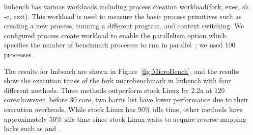 lmbench has various workloads including process creation workload(fork,
exec, sh -c, exit).
This workload is used to measure the basic process primitives such as creating
a new process, running a different program, and context switching. 
We configured process create workload to enable the parallelism option which
specifies the number of benchmark processes to run in
parallel~\cite{mcvoy1996lmbench}; we used 100 processes.

The results for lmbench are shown in Figure~\ref{fig:MicroBench}, 
and the results show the execution times of the fork microbenchmark in lmbench
with four different methods.
Three methods outperform stock Linux by 2.2x at 120 cores;however, before 30
core, two harris list have lower performance due to their execution overheads.
While stock Linux has 90\% idle time, other methods have approximately 50\%
idle time since stock Linux waits to acquire reverse mapping locks such as
 and .













